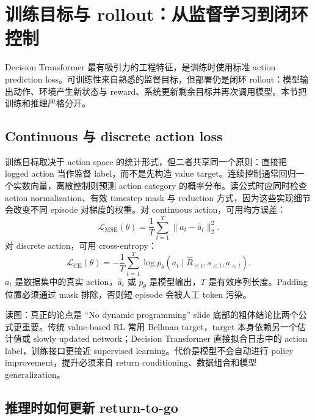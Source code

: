 \section{训练目标与 rollout：从监督学习到闭环控制}

Decision Transformer 最有吸引力的工程特征，是训练时使用标准 action prediction loss。可训练性来自熟悉的监督目标，但部署仍是闭环 rollout：模型输出动作、环境产生新状态与 reward、系统更新剩余目标并再次调用模型。本节把训练和推理严格分开。

\subsection{Continuous 与 discrete action loss}

训练目标取决于 action space 的统计形式，但二者共享同一个原则：直接把 logged action 当作监督 label，而不是先构造 value target。连续控制通常回归一个实数向量，离散控制则预测 action category 的概率分布。读公式时应同时检查 action normalization、有效 timestep mask 与 reduction 方式，因为这些实现细节会改变不同 episode 对梯度的权重。对 continuous action，可用均方误差：
\[
\mathcal{L}_{\mathrm{MSE}}(\theta)
=\frac{1}{T}\sum_{t=1}^{T}\lVert a_t-\widehat{a}_t\rVert_2^2.
\]
对 discrete action，可用 cross-entropy：
\[
\mathcal{L}_{\mathrm{CE}}(\theta)
=-\frac{1}{T}\sum_{t=1}^{T}\log p_{\theta}(a_t\mid \widehat{R}_{\le t},s_{\le t},a_{<t}).
\]
$a_t$ 是数据集中的真实 action，$\widehat{a}_t$ 或 $p_{\theta}$ 是模型输出，$T$ 是有效序列长度。Padding 位置必须通过 mask 排除，否则短 episode 会被人工 token 污染。


\begin{knowledgebox}{读图：真正的论点是 “No dynamic programming”}
slide 底部的粗体结论比两个公式更重要。传统 value-based RL 常用 Bellman target，target 本身依赖另一个估计值或 slowly updated network；Decision Transformer 直接拟合日志中的 action label，训练接口更接近 supervised learning。代价是模型不会自动进行 policy improvement，提升必须来自 return conditioning、数据组合和模型 generalization。
\end{knowledgebox}


\subsection{推理时如何更新 return-to-go}

